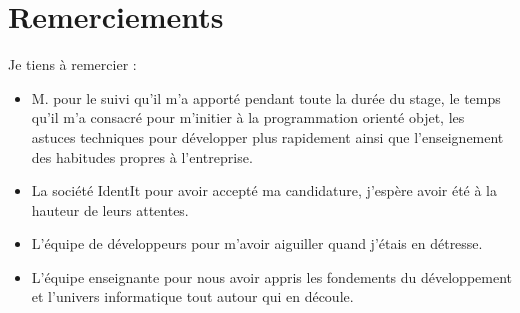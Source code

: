 \chapter*{Remerciements} %
\label{cha:Remerciements}

Je tiens à remercier :
\begin{itemize}
\item M. pour le suivi qu'il m'a apporté pendant toute la durée du
stage, le temps qu'il m'a consacré pour m'initier à la programmation orienté
objet, les astuces techniques pour développer plus rapidement ainsi que
l'enseignement des habitudes propres à l'entreprise.
\item La société IdentIt pour avoir accepté ma candidature, j'espère avoir
été à la hauteur de leurs attentes.
\item L'équipe de développeurs pour m'avoir aiguiller quand j'étais en
détresse.
\item L'équipe enseignante pour nous avoir appris les fondements du
développement et l'univers informatique tout autour qui en découle.
\end{itemize}
